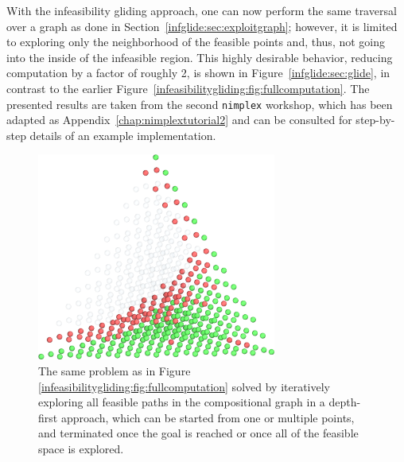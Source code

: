 With the infeasibility gliding approach, one can now perform the same traversal over a graph as done in Section~\ref{infglide:sec:exploitgraph}; however, it is limited to exploring only the neighborhood of the feasible points and, thus, not going into the inside of the infeasible region. This highly desirable behavior, reducing computation by a factor of roughly 2, is shown in Figure~\ref{infglide:sec:glide}, in contrast to the earlier Figure~\ref{infeasibilitygliding:fig:fullcomputation}. The presented results are taken from the second \texttt{nimplex} workshop, which has been adapted as Appendix~\ref{chap:nimplextutorial2} and can be consulted for step-by-step details of an example implementation.

\begin{figure}[H]
    \centering
    \includegraphics[width=0.7\textwidth]{infeasibilitygliding/InfeasibilityGliding_Glide.png}
    \caption{The same problem as in Figure \ref{infeasibilitygliding:fig:fullcomputation} solved by iteratively exploring all feasible paths in the compositional graph in a depth-first approach, which can be started from one or multiple points, and terminated once the goal is reached or once all of the feasible space is explored.}
    \label{infeasibilitygliding:fig:glide}
\end{figure}


\printbibliography[heading=subbibintoc]